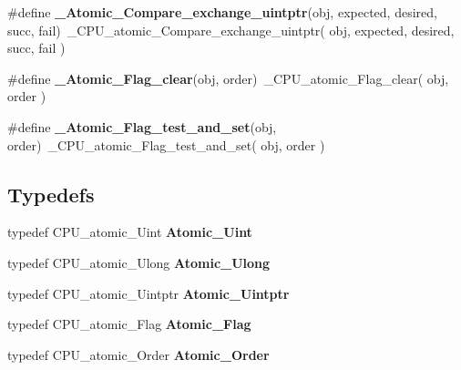 \begin{DoxyCompactItemize}
\item 
\mbox{\label{group__RTEMSScoreAtomic_ga6ca65210bb7fb87f16b514054a8511ed}} 
\#define {\bfseries \+\_\+\+Atomic\+\_\+\+Compare\+\_\+exchange\+\_\+uintptr}(obj,  expected,  desired,  succ,  fail)~\+\_\+\+C\+P\+U\+\_\+atomic\+\_\+\+Compare\+\_\+exchange\+\_\+uintptr( obj, expected, desired, succ, fail )
\item 
\mbox{\label{group__RTEMSScoreAtomic_ga8e6cd6d3dd3cdf6044b24538cada6ebe}} 
\#define {\bfseries \+\_\+\+Atomic\+\_\+\+Flag\+\_\+clear}(obj,  order)~\+\_\+\+C\+P\+U\+\_\+atomic\+\_\+\+Flag\+\_\+clear( obj, order )
\item 
\mbox{\label{group__RTEMSScoreAtomic_ga30ef65b28b2bd0df05f5376128271551}} 
\#define {\bfseries \+\_\+\+Atomic\+\_\+\+Flag\+\_\+test\+\_\+and\+\_\+set}(obj,  order)~\+\_\+\+C\+P\+U\+\_\+atomic\+\_\+\+Flag\+\_\+test\+\_\+and\+\_\+set( obj, order )
\end{DoxyCompactItemize}
\subsection*{Typedefs}
\begin{DoxyCompactItemize}
\item 
\mbox{\label{group__RTEMSScoreAtomic_ga41c6df6dcd57c0ce1c1b8c10f82a94d0}} 
typedef C\+P\+U\+\_\+atomic\+\_\+\+Uint {\bfseries Atomic\+\_\+\+Uint}
\item 
\mbox{\label{group__RTEMSScoreAtomic_ga5a496ccac5d5e862a9f174501621e00c}} 
typedef C\+P\+U\+\_\+atomic\+\_\+\+Ulong {\bfseries Atomic\+\_\+\+Ulong}
\item 
\mbox{\label{group__RTEMSScoreAtomic_ga67070c5399ab576c181dcf9eaf0e5711}} 
typedef C\+P\+U\+\_\+atomic\+\_\+\+Uintptr {\bfseries Atomic\+\_\+\+Uintptr}
\item 
\mbox{\label{group__RTEMSScoreAtomic_ga1502dfb0ebaa5a66a8fe763cb341f1c9}} 
typedef C\+P\+U\+\_\+atomic\+\_\+\+Flag {\bfseries Atomic\+\_\+\+Flag}
\item 
\mbox{\label{group__RTEMSScoreAtomic_ga986891ce68e0228136434f317572ef5e}} 
typedef C\+P\+U\+\_\+atomic\+\_\+\+Order {\bfseries Atomic\+\_\+\+Order}
\end{DoxyCompactItemize}


